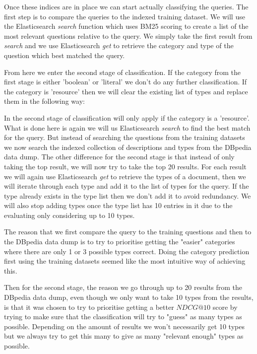 \documentclass[sigconf]{acmart}
\begin{document}
Once these indices are in place we can start actually classifying the queries. The first step is to compare the queries to the indexed training dataset. We will use the Elasticsearch \emph{search} function which uses BM25 scoring to create a list of the most relevant questions relative to the query. We simply take the first result from \emph{search} and we use Elasticsearch \emph{get} to retrieve the category and type of the question which best matched the query.

From here we enter the second stage of classification. If the category from the first stage is either 'boolean' or 'literal' we don't do any further classification. If the category is 'resource' then we will clear the existing list of types and replace them in the following way:

In the second stage of classification will only apply if the category is a 'resource'. What is done here is again we will us Elasticsearch \emph{search} to find the best match for the query. But instead of searching the questions from the training datasets we now search the indexed collection of descriptions and types from the DBpedia data dump. The other difference for the second stage is that instead of only taking the top result, we will now try to take the top 20 results. For each result we will again use Elasticsearch \emph{get} to retrieve the types of a document, then we will iterate through each type and add it to the list of types for the query. If the type already exists in the type list then we don't add it to avoid redundancy. We will also stop adding types once the type list has 10 entries in it due to the evaluating only considering up to 10 types. 

\hfill \break

The reason that we first compare the query to the training questions and then to the DBpedia data dump is to try to prioritise getting the "easier" categories where there are only 1 or 3 possible types correct. Doing the category prediction first using the training datasets seemed like the most intuitive way of achieving this. 

Then for the second stage, the reason we go through up to 20 results from the DBpedia data dump, even though we only want to take 10 types from the results, is that it was chosen to try to prioritise getting a better $NDCG@10$ score by trying to make sure that the classification will try to "guess" as many types as possible. Depending on the amount of results we won't necessarily get 10 types but we always try to get this many to give as many "relevant enough" types as possible. 
\end{document}
